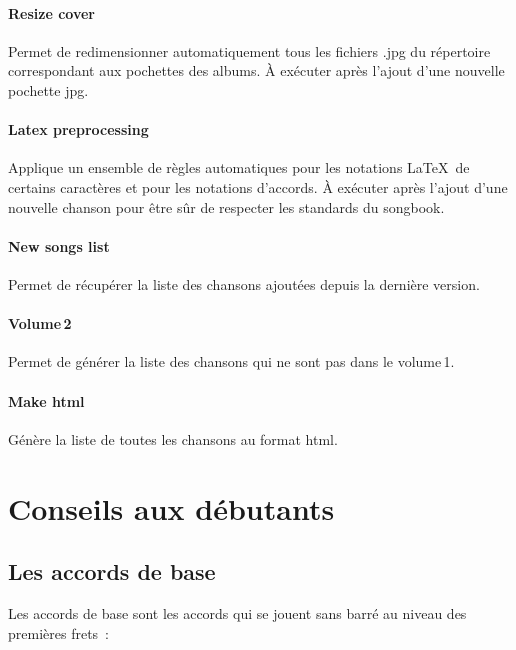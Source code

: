 \documentclass[online]{patacrep}
\begin{document}
\paragraph{Resize cover}
Permet de redimensionner automatiquement tous les fichiers .jpg du
répertoire  correspondant aux pochettes des
albums. À exécuter après l'ajout d'une nouvelle pochette jpg.

\paragraph{Latex preprocessing}
Applique un ensemble de règles automatiques pour les notations
\LaTeX\, de certains caractères et pour les notations d'accords.  À
exécuter après l'ajout d'une nouvelle chanson pour être sûr de
respecter les standards du songbook.

\paragraph{New songs list}
Permet de récupérer la liste des chansons ajoutées depuis la dernière
version.

\paragraph{Volume\,2}
Permet de générer la liste des chansons qui ne sont pas dans le
volume\,1.

\paragraph{Make html}
Génère la liste de toutes les chansons au format html.


\section{Conseils aux débutants}

\subsection{Les accords de base}

Les accords de base sont les accords qui se jouent sans barré au
niveau des premières frets~:
\end{document}
